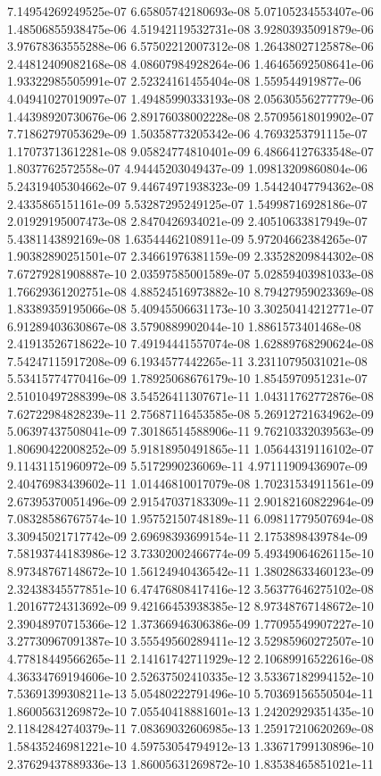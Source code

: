 7.14954269249525e-07	6.65805742180693e-08	5.07105234553407e-06	1.48506855938475e-06	4.51942119532731e-08	3.92803935091879e-06	3.97678363555288e-06	6.57502212007312e-08	1.26438027125878e-06	2.44812409082168e-08	4.08607984928264e-06	1.46465692508641e-06
1.93322985505991e-07	2.52324161455404e-08	1.559544919877e-06	4.04941027019097e-07	1.49485990333193e-08	2.05630556277779e-06	1.44398920730676e-06	2.89176038002228e-08	2.57095618019902e-07	7.71862797053629e-09	1.50358773205342e-06	4.7693253791115e-07
1.17073713612281e-08	9.05824774810401e-09	6.48664127633548e-07	1.8037762572558e-07	4.94445203049437e-09	1.09813209860804e-06	5.24319405304662e-07	9.44674971938323e-09	1.54424047794362e-08	2.4335865151161e-09	5.53287295249125e-07	1.54998716928186e-07
2.01929195007473e-08	2.8470426934021e-09	2.40510633817949e-07	5.4381143892169e-08	1.63544462108911e-09	5.97204662384265e-07	1.90382890251501e-07	2.34661976381159e-09	2.33528209844302e-08	7.67279281908887e-10	2.03597585001589e-07	5.02859403981033e-08
1.76629361202751e-08	4.88524516973882e-10	8.79427959023369e-08	1.83389359195066e-08	5.40945506631173e-10	3.30250414212771e-07	6.91289403630867e-08	3.5790889902044e-10	1.8861573401468e-08	2.41913526718622e-10	7.49194441557074e-08	1.62889768290624e-08
7.54247115917208e-09	6.1934577442265e-11	3.23110795031021e-08	5.53415774770416e-09	1.78925068676179e-10	1.8545970951231e-07	2.51010497288399e-08	3.54526411307671e-11	1.04311762772876e-08	7.62722984828239e-11	2.75687116453585e-08	5.26912721634962e-09
5.06397437508041e-09	7.30186514588906e-11	9.76210332039563e-09	1.80690422008252e-09	5.91818950491865e-11	1.05644319116102e-07	9.11431151960972e-09	5.5172990236069e-11	4.97111909436907e-09	2.40476983439602e-11	1.01446810017079e-08	1.70231534911561e-09
2.67395370051496e-09	2.91547037183309e-11	2.90182160822964e-09	7.08328586767574e-10	1.95752150748189e-11	6.09811779507694e-08	3.30945021717742e-09	2.69698393699154e-11	2.1753898439784e-09	7.58193744183986e-12	3.73302002466774e-09	5.49349064626115e-10
8.97348767148672e-10	1.56124940436542e-11	1.38028633460123e-09	2.32438345577851e-10	6.47476808417416e-12	3.56377646275102e-08	1.20167724313692e-09	9.42166453938385e-12	8.97348767148672e-10	2.39048970715366e-12	1.37366946306386e-09	1.77095549907227e-10
3.27730967091387e-10	3.55549560289411e-12	3.52985960272507e-10	4.77818449566265e-11	2.14161742711929e-12	2.10689916522616e-08	4.36334769194606e-10	2.52637502410335e-12	3.53367182994152e-10	7.53691399308211e-13	5.05480222791496e-10	5.70369156550504e-11
1.86005631269872e-10	7.05540418881601e-13	1.24202929351435e-10	2.11842842740379e-11	7.08369032606985e-13	1.25917210620269e-08	1.58435246981221e-10	4.59753054794912e-13	1.33671799130896e-10	2.37629437889336e-13	1.86005631269872e-10	1.83538465851021e-11

